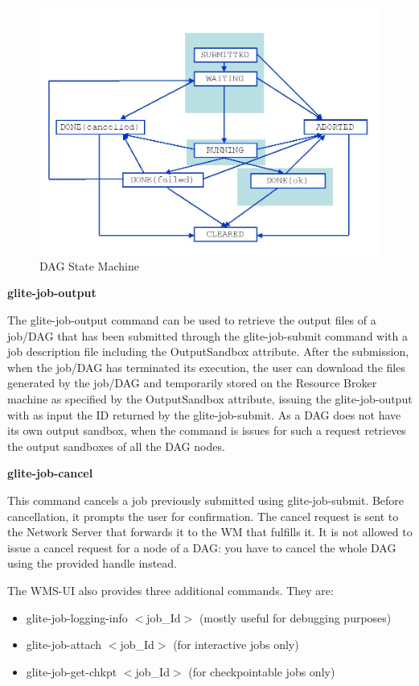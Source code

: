 \begin{figure}[htb]
\centering
\includegraphics[width=.8\hsize]{dag-state-diagram}
\caption{DAG State Machine}
\label{dag-state}
\end{figure}

\newpage
 
\textbf{glite-job-output}

The glite-job-output command can be used to retrieve the output files of a job/DAG that has been submitted through the 
glite-job-submit command with a job description file including the OutputSandbox attribute. After the submission, 
when the job/DAG has terminated its execution, the user can download the files generated by the job/DAG and temporarily 
stored on the Resource Broker machine as specified by the OutputSandbox attribute, issuing the 
glite-job-output with as input the ID returned by the glite-job-submit. As a DAG does not have its own output sandbox, 
when the command is issues for such a request retrieves the output sandboxes of all the DAG nodes.

\textbf{glite-job-cancel}

This command cancels a job previously submitted using glite-job-submit. Before cancellation, it prompts the user 
for confirmation. The cancel request is sent to the Network Server that forwards it to the WM that fulfills it. 
It is not allowed to issue a cancel request for a node of a DAG: you have to cancel the whole DAG using the 
provided handle instead.


\medskip

The WMS-UI also provides three additional commands. They are: 

\begin{itemize}
   \item glite-job-logging-info $<$job\_Id$>$ (mostly useful for debugging purposes)
   \item glite-job-attach $<$job\_Id$>$ (for interactive jobs only)
   \item glite-job-get-chkpt $<$job\_Id$>$ (for checkpointable jobs only)
\end{itemize}


